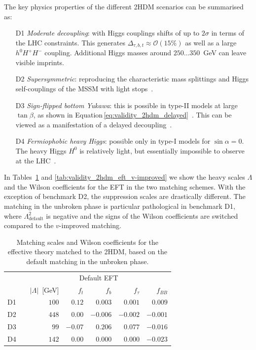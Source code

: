 The key physics properties of the different 2HDM scenarios can be
summarised as:
%
\begin{enumerate}
\item[D1] \emph{Moderate decoupling}: with Higgs couplings shifts of
  up to $2\sigma$ in terms of the LHC constraints.  This generates
  $\Delta_{\tau,b,t} \approx \mathcal{O}(15\%)$ as well as a large
  $h^0 H^+ H^-$ coupling. Additional Higgs masses around
  $250\dots350$~GeV can leave visible imprints.
%
\item[D2] \emph{Supersymmetric}: reproducing the characteristic mass
  splittings and Higgs self-couplings of the MSSM with light
  stops~\cite{Carena:2013ytb}.
%
\item[D3] \emph{Sign-flipped bottom Yukawa}: this is possible in
  type-II models at large $\tan\beta$, as shown in
  Equation\,\eqref{eq:validity_2hdm_delayed}~\cite{Ferreira:2014naa}. This
  can be viewed as a manifestation of a delayed
  decoupling~\cite{Haber:2000kq}.
%
\item[D4] \emph{Fermiophobic heavy Higgs}: possible only in type-I
  models for $\sin\alpha =0$. The heavy Higgs $H^0$ is relatively
  light, but essentially impossible to observe at the
  LHC~\cite{Hespel:2014sla}.
\end{enumerate}

In Tables~\ref{tab:validity_2hdm_eft_default} and
\ref{tab:validity_2hdm_eft_v-improved} we show the heavy scales
$\Lambda$ and the Wilson coefficients for the EFT in the two matching
schemes. With the exception of benchmark D2, the suppression scales
are drastically different. The matching in the unbroken phase is
particular pathological in benchmark D1, where
$\Lambda_{\text{default}}^2$ is negative and the signs of the Wilson
coefficients are switched compared to the $v$-improved matching.

\begin{table}
  \begin{tabular}{c c rrrrr }
    \toprule
    \multirow{2}{*}{}
    && \multicolumn{5}{c}{Default EFT} \\
    \cmidrule{3-7} 
    && $|\Lambda|$~[GeV] & $f_t$ & $f_{b}$  & $f_{\tau}$ & $f_{BB}$ \\
    \midrule
    D1 && $100$ & $0.12$ & $0.003$ & $0.001$ & $0.009$ \\
    D2 && $448$ & $0.00$ & $-0.006$ & $-0.002$  & $-0.001$ \\
    D3 && $99$ & $-0.07$ & $0.206$ & $0.077$ &  $-0.016$\\
    D4 && $142$ & $0.00$ & $0.000$ & $0.000$ &  $-0.023$\\
    \bottomrule
  \end{tabular}
  \caption[Default EFT description for the 2HDM benchmarks]{Matching scales and Wilson coefficients for the effective
    theory matched to the 2HDM, based on the default matching in the unbroken phase.}
 \label{tab:validity_2hdm_eft_default}
\end{table}

